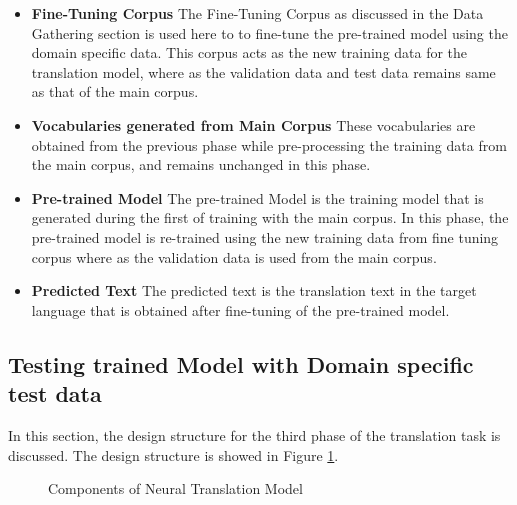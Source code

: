 \begin{itemize}
    \item \textbf{Fine-Tuning Corpus} The Fine-Tuning Corpus as discussed in the Data Gathering section is used here to to fine-tune the pre-trained model using the domain specific data. This corpus acts as the new training data for the translation model, where as the validation data and test data remains same as that of the main corpus.
    \item \textbf{Vocabularies generated from Main Corpus} These vocabularies are obtained from the previous phase while pre-processing the training data from the main corpus, and remains unchanged in this phase.
    \item \textbf{Pre-trained Model} The pre-trained Model is the training model that is generated during the first of training with the main corpus. In this phase, the pre-trained model is re-trained using the new training data from fine tuning corpus where as the validation data is used from the main corpus.
    \item \textbf{Predicted Text} The predicted text is the translation text in the target language that is obtained after fine-tuning of the pre-trained model. 
\end{itemize}


\subsection{Testing trained Model with Domain specific test data}
In this section, the design structure for the third phase of the translation task is discussed. The design structure is showed in Figure \ref{seq2seq4}.

\begin{figure}[h]
\caption{Components of Neural Translation Model} \label{seq2seq4}
\end{figure}

